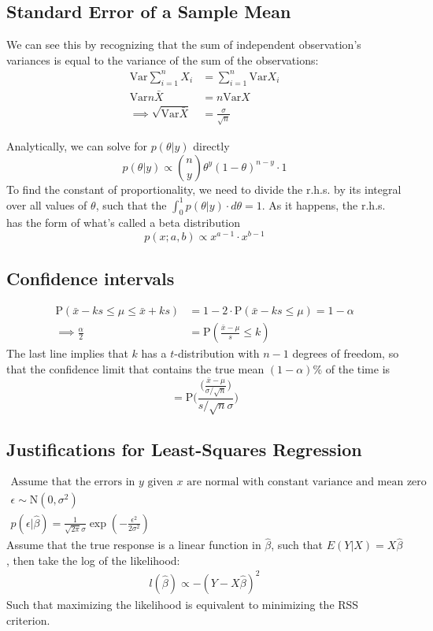 \documentclass[11pt,a4paper,article]{memoir} %
\begin{document}
\subsection{Standard Error of a Sample Mean}
We can see this by recognizing that the sum of independent observation's variances is equal to the variance of the sum of the observations:
\begin{align}
 \text{Var}\sum_{i = 1}^n X_i &= \sum_{i = 1}^n \text{Var}X_i\\
	\text{Var}n\bar{X} &= n\text{Var}X \\
	\implies \sqrt{\text{Var}\bar{X}} &= \frac{\sigma}{\sqrt{n}}
\end{align}
\par
Analytically, we can solve for $p(\theta|y)$ directly
\[
  p(\theta|y) \propto \binom{n}{y}\theta^y (1 - \theta)^{n-y}\cdot 1
\]
To find the constant of proportionality, we need to divide the r.h.s. by its integral over all values of $\theta$, such that the $\int_0^1 p(\theta|y)\cdot d\theta = 1$. As it happens, the r.h.s. has the form of what's called a beta distribution
\[
  p(x; a, b) \propto x^{a - 1}\cdot x^{b-1}
\]

\subsection{Confidence intervals}
\begin{align}
	\text{P}(\bar{x} - ks \leq \mu \leq \bar{x} + ks) &= 1 - 2\cdot \text{P}(\bar{x} - ks \leq \mu) = 1 - \alpha \nonumber\\
	\implies \frac{\alpha}{2} &= \text{P}(\frac{\bar{x} - \mu}{s} \leq k) 
\end{align}
The last line implies that $k$ has a $t$-distribution with $n - 1$ degrees of freedom, so that the confidence limit that contains the true mean $(1 - \alpha)\%$ of the time is
\begin{equation}
	[\bar{x} - t_{n-1}(\alpha)\cdot s, \ \bar{x} + t_{n-1}(\alpha)\cdot s]
\end{equation}
\[
	 = \text{P}\Bigg(\frac{\Big(\frac{\bar{x} - \mu}{\sigma/\sqrt{n}}\Big)}{s/\sqrt{n}\sigma}\Bigg)
\]


\subsection{Justifications for Least-Squares Regression}
\begin{gather}
	\text{Assume that the errors in $y$ given $x$ are normal with constant variance and mean zero}\\
	\epsilon \sim \text{N}(0, \sigma^2) \\
	p(\epsilon|\hat{\beta}) = \frac{1}{\sqrt{2\pi}\sigma} \exp (-\frac{\epsilon^2}{2\sigma^2})
\end{gather}
Assume that the true response is a linear function in $\hat{\beta}$, such that $E(Y|X) = X\hat{\beta}$, then take the log of the likelihood:
\begin{gather}
	l(\hat{\beta}) \propto -(Y - X\hat{\beta})^2
\end{gather}
Such that maximizing the likelihood is equivalent to minimizing the RSS criterion.
\end{document}

